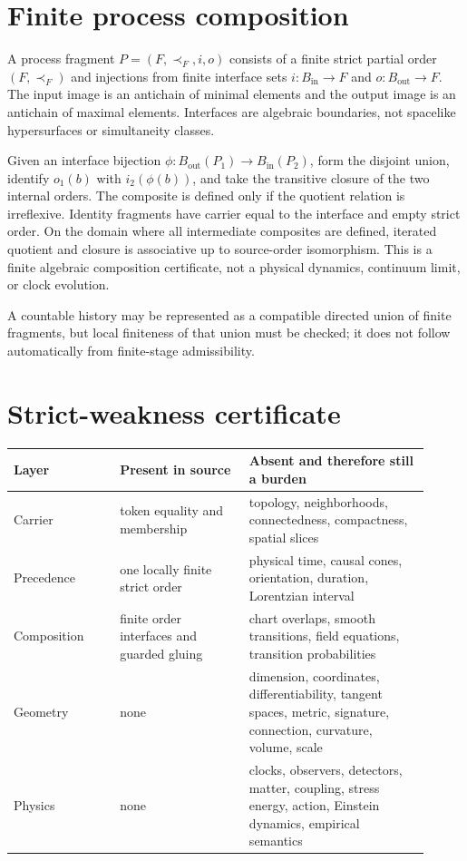 \documentclass[11pt]{article}
\begin{document}
\section{Finite process composition}

A process fragment $P=(F,\prec_F,i,o)$ consists of a finite strict partial
order $(F,\prec_F)$ and injections from finite interface sets
$i:B_{\mathrm{in}}\to F$ and $o:B_{\mathrm{out}}\to F$. The input image is
an antichain of minimal elements and the output image is an antichain of
maximal elements. Interfaces are algebraic boundaries, not spacelike
hypersurfaces or simultaneity classes.

Given an interface bijection
$\phi:B_{\mathrm{out}}(P_1)\to B_{\mathrm{in}}(P_2)$, form the disjoint union,
identify $o_1(b)$ with $i_2(\phi(b))$, and take the transitive closure of the
two internal orders. The composite is defined only if the quotient relation is
irreflexive. Identity fragments have carrier equal to the interface and empty
strict order. On the domain where all intermediate composites are defined,
iterated quotient and closure is associative up to source-order isomorphism.
This is a finite algebraic composition certificate, not a physical dynamics,
continuum limit, or clock evolution.

A countable history may be represented as a compatible directed union of
finite fragments, but local finiteness of that union must be checked; it does
not follow automatically from finite-stage admissibility.

\section{Strict-weakness certificate}

\begin{longtable}{p{0.23\linewidth}p{0.29\linewidth}p{0.39\linewidth}}
\toprule
Layer & Present in source & Absent and therefore still a burden \\
\midrule
\endhead
Carrier & token equality and membership & topology, neighborhoods,
connectedness, compactness, spatial slices \\
Precedence & one locally finite strict order & physical time, causal cones,
orientation, duration, Lorentzian interval \\
Composition & finite order interfaces and guarded gluing & chart overlaps,
smooth transitions, field equations, transition probabilities \\
Geometry & none & dimension, coordinates, differentiability, tangent spaces,
metric, signature, connection, curvature, volume, scale \\
Physics & none & clocks, observers, detectors, matter, coupling, stress energy,
action, Einstein dynamics, empirical semantics \\
\bottomrule
\end{longtable}
\end{document}
